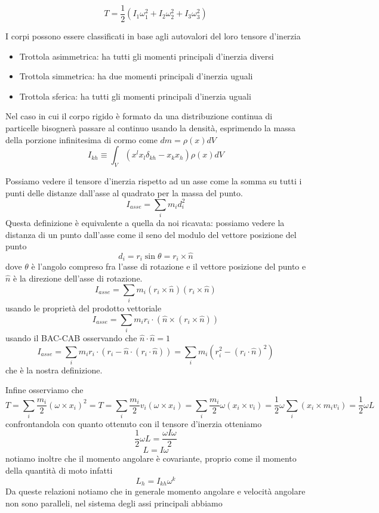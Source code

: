 \documentclass[
10pt, %
a4paper, %
oneside, %
headinclude,footinclude, %
BCOR5mm, %
]{scrartcl}
\begin{document}
\[T = \frac{1}{2}(I_1\omega_1^2+I_2\omega_2^2+I_3\omega_3^2)\] 
\begin{definizione}[Trottole]
	I corpi possono essere classificati in base agli autovalori del loro tensore d'inerzia
	\begin{itemize}
		\item Trottola asimmetrica: ha tutti gli momenti principali d'inerzia diversi
		\item Trottola simmetrica: ha due momenti principali d'inerzia uguali
		\item Trottola sferica: ha tutti gli momenti principali d'inerzia uguali
	\end{itemize}
\end{definizione}
Nel caso in cui il corpo rigido è formato da una distribuzione continua di particelle bisognerà passare al continuo usando la densità, esprimendo la massa della porzione infinitesima di cormo come \(dm = \rho(x)dV\)
\[I_{kh} \equiv \int_V ( x^lx_l\delta_{kh}- x_kx_h)\rho(x)dV \]
\begin{osservazione}
	Possiamo vedere il tensore d'inerzia rispetto ad un asse come la somma su tutti i punti delle distanze dall'asse al quadrato per la massa del punto. 
	\[I_{asse} = \sum_im_i d_i^2\]
	Questa definizione è equivalente a quella da noi ricavata: possiamo vedere la distanza di un punto dall'asse come il seno del modulo del vettore posizione del punto
	\[d_i = r_i\sin\theta = r_i\times \hat{n}\]
	dove $\theta$ è l'angolo compreso fra l'asse di rotazione e il vettore posizione del punto e $\hat{n}$ è la direzione dell'asse di rotazione.
	\[I_{asse} = \sum_im_i (r_i\times\hat{n})(r_i\times\hat{n})\]
	usando le proprietà del prodotto vettoriale
	\[I_{asse} = \sum_im_i r_i\cdot(\hat{n}\times(r_i\times\hat{n}))\]
	usando il BAC-CAB osservando che \(\hat{n}\cdot\hat{n} = 1\)
	\[I_{asse} = \sum_im_i r_i\cdot(r_i-\hat{n}\cdot(r_i\cdot\hat{n})) = \sum_im_i (r_i^2-(r_i\cdot\hat{n})^2)\]
	che è la nostra definizione.
\end{osservazione}
Infine osserviamo che
\[T = \sum_i \frac{m_i}{2}(\omega\times x_i)^2 = T = \sum_i \frac{m_i}{2}v_i(\omega\times x_i) = 
\sum_i \frac{m_i}{2}\omega(x_i\times v_i) =  \frac{1}{2}\omega\sum_i(x_i\times m_iv_i) = \frac{1}{2}\omega L\]
confrontandola con quanto ottenuto con il tensore d'inerzia otteniamo
\[\frac{1}{2}\omega L = \frac{\omega I\omega}{2}\]
\[L = I\omega\]
notiamo inoltre che il momento angolare è covariante, proprio come il momento della quantità di moto infatti 
\[L_h = I_{kh}\omega^k\]
Da queste relazioni notiamo che in generale momento angolare e velocità angolare non sono paralleli, nel sistema degli assi principali abbiamo
\end{document}
